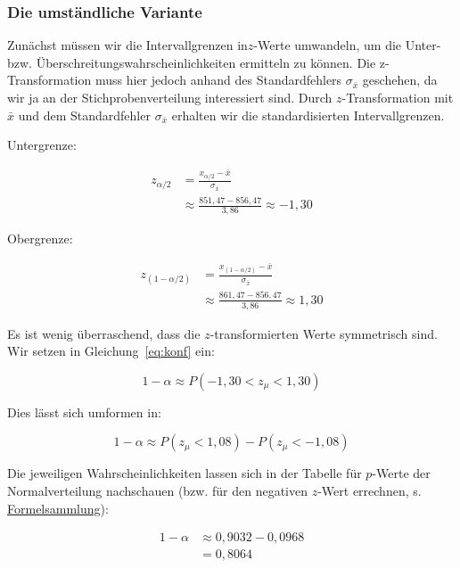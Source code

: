 \documentclass[
  11pt,
  ngerman,
  a4paper,
]{report}
\begin{document}
\hypertarget{die-umstuxe4ndliche-variante}{%
\subsubsection{Die umständliche Variante}\label{die-umstuxe4ndliche-variante}}

Zunächst müssen wir die Intervallgrenzen in\(z\)-Werte umwandeln, um die Unter- bzw. Überschreitungswahrscheinlichkeiten ermitteln zu können. Die z-Transformation muss hier jedoch anhand des Standardfehlers \(\sigma_{\bar{x}}\) geschehen, da wir ja an der Stichprobenverteilung interessiert sind. Durch \(z\)-Transformation mit \(\bar{x}\) und dem Standardfehler \(\sigma_{\bar{x}}\) erhalten wir die standardisierten Intervallgrenzen.

Untergrenze:

\nopagebreak

\[\begin{aligned}
z_{\alpha/2} &= \frac{x_{\alpha/2}-\bar{x}}{\sigma_{\bar{x}}}\\[4pt]
&\approx\frac{851{,}47-856,47}{3,86}\approx-1,30
\end{aligned}\]

Obergrenze:

\nopagebreak

\[\begin{aligned}
z_{(1-\alpha/2)} &= \frac{x_{(1-\alpha/2)}-\bar{x}}{\sigma_{\bar{x}}}\\[4pt]
&\approx\frac{861{,}47-856,47}{3,86}\approx1,30
\end{aligned}\]

Es ist wenig überraschend, dass die \(z\)-transformierten Werte symmetrisch sind. Wir setzen in Gleichung~\eqref{eq:konf} ein:

\nopagebreak

\[1-\alpha\approx P(-1{,}30 <z_{\mu} < 1{,}30)\]

Dies lässt sich umformen in:

\nopagebreak

\[
1-\alpha\approx P(z_{\mu}<1{,}08) - P(z_{\mu}<-1{,}08) 
\]

Die jeweiligen Wahrscheinlichkeiten lassen sich in der Tabelle für \(p\)-Werte der Normalverteilung nachschauen (bzw. für den negativen \(z\)-Wert errechnen, s. \href{Formelsammlung\%20und\%20Wertetabellen.pdf}{Formelsammlung}):

\nopagebreak

\[
\begin{aligned}
1-\alpha&\approx 0,9032 - 0,0968\\
&=0,8064
\end{aligned}
\]
\end{document}
